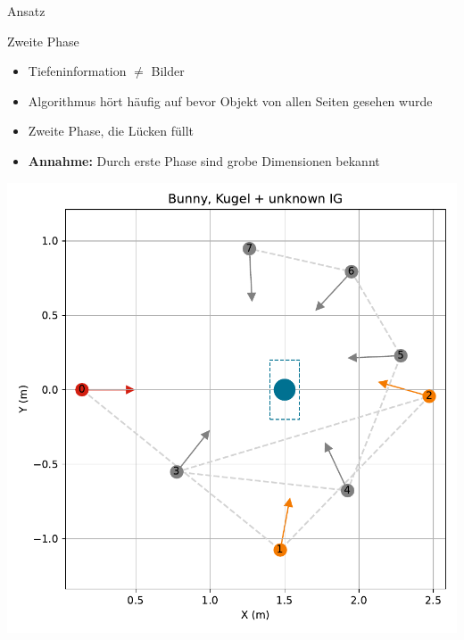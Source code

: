\documentclass[aspectratio=169]{beamer}
\begin{document}
\begin{frame}{Ansatz}
	\begin{minipage}{0.59\textwidth}
		\begin{block}{Zweite Phase}
			\begin{itemize}
				\item Tiefeninformation $\neq$ Bilder
				\item Algorithmus hört häufig auf bevor Objekt von allen Seiten gesehen wurde
				\item Zweite Phase, die Lücken füllt
				\item \textbf{Annahme:} Durch erste Phase sind grobe Dimensionen bekannt
			\end{itemize}
		\end{block}
	\end{minipage}
	\begin{minipage}{0.4\textwidth}
		\centering
		\includegraphics[width=1\textwidth]{Graphics/bunny_sphere_unknown_views.pdf}
	\end{minipage}
\end{frame}
\end{document}
